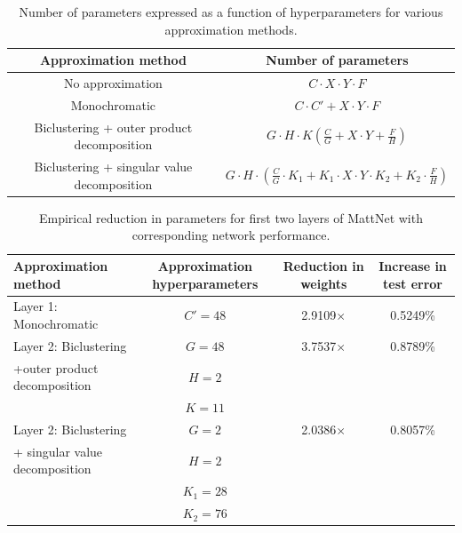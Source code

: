 \begin{table}[t]
\tiny
\centering
\begin{tabular}{cc}
\hline
Approximation method & Number of parameters \\
\hline
No approximation & $C \cdot X \cdot Y \cdot F$\\
Monochromatic & $C \cdot C' + X \cdot Y \cdot F$\\
Biclustering + outer product decomposition & $G \cdot H \cdot K (\frac{C}{G} + X \cdot Y + \frac{F}{H})$ \\
Biclustering + singular value decomposition & $G \cdot H \cdot (\frac{C}{G} \cdot K_1 + K_1 \cdot X \cdot Y \cdot K_2 + K_2 \cdot \frac{F}{H})$ \\
\hline 
\end{tabular}
\caption{Number of parameters expressed as a function of hyperparameters for various approximation methods.} 
\label{table:memory_theory}
\end{table}

\begin{table}[t]
\tiny
\centering
\begin{tabular}{lccc}
\hline
Approximation method &Approximation hyperparameters &  Reduction in weights & Increase in test error\\
\hline
\hline
Layer 1: Monochromatic & $C' = 48$ & 2.9109$\times$ & 0.5249\%\\
\hline
Layer 2: Biclustering & $G = 48$ & 3.7537$\times$ & 0.8789\%\\
	    +outer product decomposition & $H = 2$ & & \\
								     & $K = 11$ & & \\
\hline
Layer 2: Biclustering & $G = 2$ & 2.0386$\times$ & 0.8057\% \\
	  + singular value decomposition	& $H = 2$ & &\\
										& $K_1 = 28$ & &\\
										& $K_2 = 76$ & &\\
\hline 
\end{tabular}
\caption{Empirical reduction in parameters for first two layers of MattNet with corresponding network performance.} 
\label{table:memory_empirical}
\end{table}

